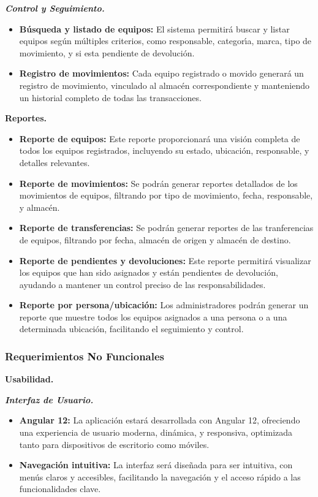 \documentclass[stu, 12pt, letterpaper, donotrepeattitle, floatsintext, natbib]{apa7}
\begin{document}
\textit{\textbf{Control y Seguimiento.}}
\begin{itemize}
    \item\textbf{B\'usqueda y listado de equipos: }El sistema permitir\'a buscar y listar equipos seg\'un m\'ultiples criterios, como responsable, categor\'{\i}a, marca, tipo de movimiento, y si esta pendiente de devoluci\'on.
    \item\textbf{Registro de movimientos: }Cada equipo registrado o movido generar\'a un registro de movimiento, vinculado al almac\'en correspondiente y manteniendo un historial completo de todas las transacciones.
\end{itemize}

\textbf{Reportes.}
\begin{itemize}
    \item\textbf{Reporte de equipos: }Este reporte proporcionar\'a una visi\'on completa de todos los equipos registrados, incluyendo su estado, ubicaci\'on, responsable, y detalles relevantes.
    \item\textbf{Reporte de movimientos: }Se podr\'an generar reportes detallados de los movimientos de equipos, filtrando por tipo de movimiento, fecha, responsable, y almac\'en.
    \item\textbf{Reporte de transferencias: }Se podr\'an generar reportes de las tranferencias de equipos, filtrando por fecha, almac\'en de origen y almac\'en de destino.
    \item\textbf{Reporte de pendientes y devoluciones: }Este reporte permitir\'a visualizar los equipos que han sido asignados y est\'an pendientes de devoluci\'on, ayudando a mantener un control preciso de las responsabilidades.
    \item\textbf{Reporte por persona/ubicaci\'on: }Los administradores podr\'an generar un reporte que muestre todos los equipos asignados a una persona o a una determinada ubicaci\'on, facilitando el seguimiento y control.
\end{itemize}
\subsubsection{Requerimientos No Funcionales}
\textbf{Usabilidad.}

\textit{\textbf{Interfaz de Usuario.}}
\begin{itemize}
    \item\textbf{Angular 12: }La aplicaci\'on estar\'a desarrollada con Angular 12, ofreciendo una experiencia de usuario moderna, din\'amica, y responsiva, optimizada tanto para dispositivos de escritorio como m\'oviles.
    \item\textbf{Navegaci\'on intuitiva: }La interfaz ser\'a dise\~{n}ada para ser intuitiva, con men\'us claros y accesibles, facilitando la navegaci\'on y el acceso r\'apido a las funcionalidades clave.
\end{itemize}
\end{document}
